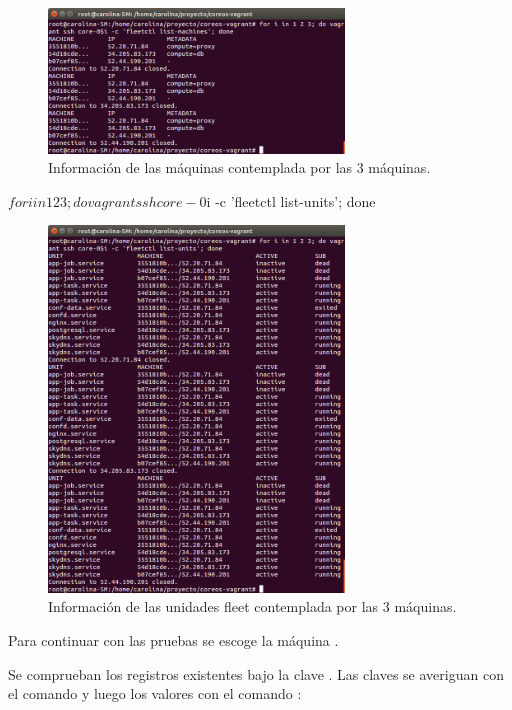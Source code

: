 \begin{figure}[H]
\centering
\includegraphics[width=0.7\textwidth]{images/figures/machines-confd.png}
\caption{Información de las máquinas contemplada por las 3 máquinas.}
\end{figure}

\begin{code}
$ for i in 1 2 3; do vagrant ssh core-0$i -c 'fleetctl list-units'; done
\end{code}

\begin{figure}[H]
\centering
\includegraphics[width=0.7\textwidth]{images/figures/units-confd.png}
\caption{Información de las unidades fleet contemplada por las 3 máquinas.}
\end{figure}

Para continuar con las pruebas se escoge la máquina .

Se comprueban los registros existentes bajo la clave . Las claves se averiguan con el comando  y luego los valores con el comando :

